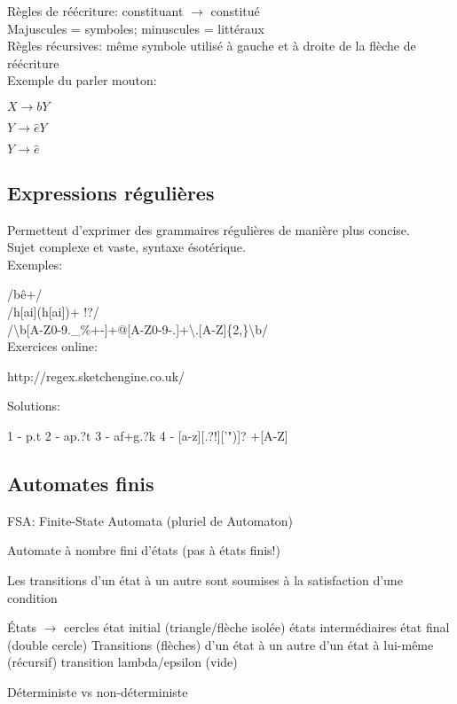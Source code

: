 Règles de réécriture: constituant $\rightarrow$ constitué\\
Majuscules = symboles; minuscules = littéraux\\
Règles récursives: même symbole utilisé à gauche et à droite de la flèche de réécriture\\

Exemple du parler mouton:

$ X \rightarrow bY $

$ Y \rightarrow \hat e Y $

$ Y \rightarrow \hat e $

\subsection{Expressions régulières}

Permettent d'exprimer des grammaires régulières de manière plus concise.\\
Sujet complexe et vaste, syntaxe ésotérique.\\

Exemples:

/bê+/\\
/h[ai](h[ai])+  !?/\\
/\textbackslash b[A-Z0-9.\_\%+-]+@[A-Z0-9-.]+\textbackslash .[A-Z]\{2,\}\textbackslash b/\\

Exercices online:

http://regex.sketchengine.co.uk/

Solutions:

1 - p.t
2 - ap.?t
3 - af+g.?k
4 - [a-z][.?!]['")]? +[A-Z]

\subsection{Automates finis}

FSA: Finite-State Automata (pluriel de Automaton)

Automate à nombre fini d'états (pas à états finis!)

Les transitions d'un état à un autre sont soumises à la satisfaction d'une condition

États $\rightarrow$ cercles
    état initial (triangle/flèche isolée)
    états intermédiaires
    état final (double cercle)
Transitions (flèches)
    d'un état à un autre
    d'un état à lui-même (récursif)
    transition lambda/epsilon (vide)

Déterministe vs non-déterministe

